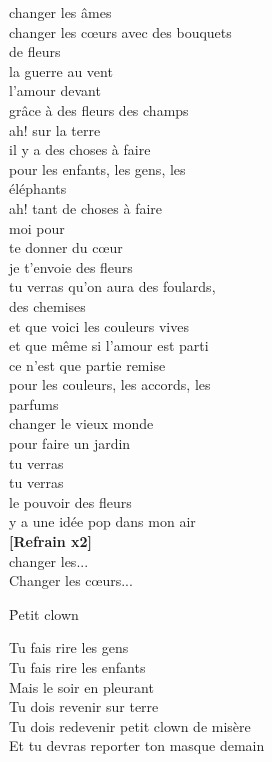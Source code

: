 \documentclass{novel}
\begin{document}
\begin{multicols}{2}
changer les âmes \\
changer les cœurs avec des bouquets \\
de fleurs \\
la guerre au vent \\
l'amour devant \\
grâce à des fleurs des champs \\

ah! sur la terre \\
il y a des choses à faire \\
pour les enfants, les gens, les \\
éléphants \\
ah! tant de choses à faire \\
moi pour \\
te donner du cœur \\
je t'envoie des fleurs \\

tu verras qu'on aura des foulards, \\
des chemises \\
et que voici les couleurs vives \\
et que même si l'amour est parti \\
ce n'est que partie remise \\
pour les couleurs, les accords, les \\
parfums \\
changer le vieux monde \\
pour faire un jardin \\
tu verras \\
tu verras \\
le pouvoir des fleurs \\
y a une idée pop dans mon air \\

\textbf{[Refrain x2]} \\

changer les... \\
Changer les cœurs... \\
\end{multicols}

\newpage
\normalsize

\h*{Petit clown}

Tu fais rire les gens \\
Tu fais rire les enfants \\
Mais le soir en pleurant \\
Tu dois revenir sur terre \\
Tu dois redevenir petit clown de misère \\
Et tu devras reporter ton masque demain \\
\end{document}
